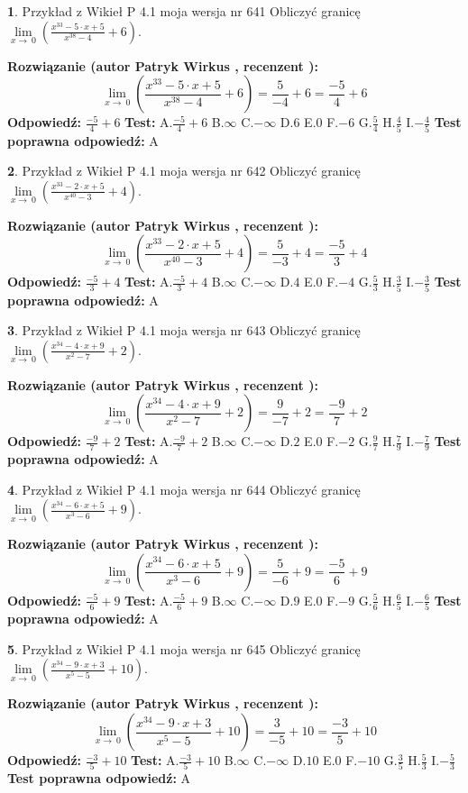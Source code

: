 \documentclass[12pt, a4paper]{article}
\theoremstyle{definition} %
\newtheorem{zad}{}
\newcommand{\zadStart}[1]{\begin{zad}#1\newline}
\newcommand{\zadStop}{\end{zad}}
\newcommand{\rozwStart}[2]{\noindent \textbf{Rozwiązanie (autor #1 , recenzent #2): }\newline}
\newcommand{\rozwStop}{\newline}
\newcommand{\odpStart}{\noindent \textbf{Odpowiedź:}\newline}
\newcommand{\odpStop}{\newline}
\newcommand{\testStart}{\noindent \textbf{Test:}\newline}
\newcommand{\testStop}{\newline}
\newcommand{\kluczStart}{\noindent \textbf{Test poprawna odpowiedź:}\newline}
\newcommand{\kluczStop}{\newline}
\begin{document}
\zadStart{Przykład z Wikieł P 4.1 moja wersja nr 641}
Obliczyć granicę $\lim\limits_{x\to\ 0}(\frac{x^{33}-5 \cdot x +5}{x^{38}-4}+6)$.
\zadStop
\rozwStart{Patryk Wirkus}{}
$$\lim\limits_{x\to\ 0}(\frac{x^{33}-5 \cdot x +5}{x^{38}-4}+6)=\frac{5}{-4}+6=\frac{-5}{4}+6$$
\rozwStop
\odpStart
$\frac{-5}{4}+6$
\odpStop
\testStart
A.$\frac{-5}{4}+6$
B.$\infty$
C.$-\infty$
D.$6$
E.$0$
F.$-6$
G.$\frac{5}{4}$
H.$\frac{4}{5}$
I.$-\frac{4}{5}$
\testStop
\kluczStart
A
\kluczStop



\zadStart{Przykład z Wikieł P 4.1 moja wersja nr 642}
Obliczyć granicę $\lim\limits_{x\to\ 0}(\frac{x^{33}-2 \cdot x +5}{x^{40}-3}+4)$.
\zadStop
\rozwStart{Patryk Wirkus}{}
$$\lim\limits_{x\to\ 0}(\frac{x^{33}-2 \cdot x +5}{x^{40}-3}+4)=\frac{5}{-3}+4=\frac{-5}{3}+4$$
\rozwStop
\odpStart
$\frac{-5}{3}+4$
\odpStop
\testStart
A.$\frac{-5}{3}+4$
B.$\infty$
C.$-\infty$
D.$4$
E.$0$
F.$-4$
G.$\frac{5}{3}$
H.$\frac{3}{5}$
I.$-\frac{3}{5}$
\testStop
\kluczStart
A
\kluczStop



\zadStart{Przykład z Wikieł P 4.1 moja wersja nr 643}
Obliczyć granicę $\lim\limits_{x\to\ 0}(\frac{x^{34}-4 \cdot x +9}{x^{2}-7}+2)$.
\zadStop
\rozwStart{Patryk Wirkus}{}
$$\lim\limits_{x\to\ 0}(\frac{x^{34}-4 \cdot x +9}{x^{2}-7}+2)=\frac{9}{-7}+2=\frac{-9}{7}+2$$
\rozwStop
\odpStart
$\frac{-9}{7}+2$
\odpStop
\testStart
A.$\frac{-9}{7}+2$
B.$\infty$
C.$-\infty$
D.$2$
E.$0$
F.$-2$
G.$\frac{9}{7}$
H.$\frac{7}{9}$
I.$-\frac{7}{9}$
\testStop
\kluczStart
A
\kluczStop



\zadStart{Przykład z Wikieł P 4.1 moja wersja nr 644}
Obliczyć granicę $\lim\limits_{x\to\ 0}(\frac{x^{34}-6 \cdot x +5}{x^{3}-6}+9)$.
\zadStop
\rozwStart{Patryk Wirkus}{}
$$\lim\limits_{x\to\ 0}(\frac{x^{34}-6 \cdot x +5}{x^{3}-6}+9)=\frac{5}{-6}+9=\frac{-5}{6}+9$$
\rozwStop
\odpStart
$\frac{-5}{6}+9$
\odpStop
\testStart
A.$\frac{-5}{6}+9$
B.$\infty$
C.$-\infty$
D.$9$
E.$0$
F.$-9$
G.$\frac{5}{6}$
H.$\frac{6}{5}$
I.$-\frac{6}{5}$
\testStop
\kluczStart
A
\kluczStop



\zadStart{Przykład z Wikieł P 4.1 moja wersja nr 645}
Obliczyć granicę $\lim\limits_{x\to\ 0}(\frac{x^{34}-9 \cdot x +3}{x^{5}-5}+10)$.
\zadStop
\rozwStart{Patryk Wirkus}{}
$$\lim\limits_{x\to\ 0}(\frac{x^{34}-9 \cdot x +3}{x^{5}-5}+10)=\frac{3}{-5}+10=\frac{-3}{5}+10$$
\rozwStop
\odpStart
$\frac{-3}{5}+10$
\odpStop
\testStart
A.$\frac{-3}{5}+10$
B.$\infty$
C.$-\infty$
D.$10$
E.$0$
F.$-10$
G.$\frac{3}{5}$
H.$\frac{5}{3}$
I.$-\frac{5}{3}$
\testStop
\kluczStart
A
\kluczStop
\end{document}
